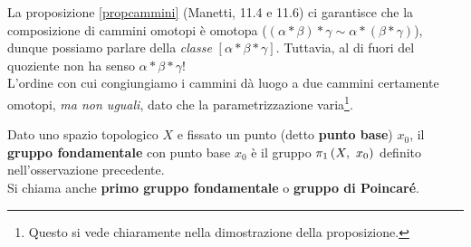 \begin{attention}
	La proposizione \ref{propcammini} (Manetti, 11.4 e 11.6) ci garantisce che la composizione di cammini omotopi è omotopa ($\left(\alpha\ast\beta\right)\ast \gamma \sim \alpha\ast\left(\beta\ast\gamma\right)$), dunque possiamo parlare della \textit{classe} $\left[\alpha\ast\beta\ast\gamma\right]$. Tuttavia, al di fuori del quoziente non ha senso $\alpha\ast\beta\ast\gamma$!\\
	L'ordine con cui congiungiamo i cammini dà luogo a due cammini certamente omotopi, \textit{ma non uguali}, dato che la parametrizzazione varia\footnote{Questo si vede chiaramente nella dimostrazione della proposizione.}.
\end{attention}
\begin{define}
	Dato uno spazio topologico $X$ e fissato un punto (detto \textbf{punto base}) $x_0$, il \textbf{gruppo fondamentale} con punto base $x_0$ è il gruppo $\gruf{X}{x_0}$ definito nell'osservazione precedente.\\
	Si chiama anche \textbf{primo gruppo fondamentale} o \textbf{gruppo di Poincaré}.
\end{define}
